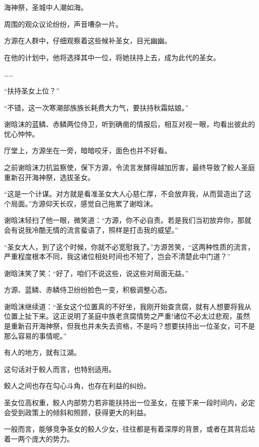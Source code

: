 
\begin{this_body}

海神祭，圣城中人潮如海。

周围的观众议论纷纷，声音嘈杂一片。

方源在人群中，仔细观察着这些候补圣女，目光幽幽。

在他的计划中，他将选择其中一位，将她扶持上去，成为此代的圣女。

……

“扶持圣女上位？”

“不错，这一次寒潮部族族长耗费大力气，要扶持秋霜姑娘。”

谢晗沫的蓝鳞、赤鳞两位侍卫，听到确凿的情报后，相互对视一眼，均看出彼此的忧心忡忡。

厅堂上，方源坐在一旁，暗暗咬牙，面色也并不好看。

之前谢晗沫力抗监察使，保下方源，令流言发酵得越加厉害，最终导致了鲛人圣庭重新召开海神祭，选拔圣女。

“这是一个计谋。对方就是看准圣女大人心慈仁厚，不会放弃我，从而营造出了这个局面。”方源仰天长叹，感觉自己拖累了谢晗沫。

谢晗沫轻扫了他一眼，微笑道：“方源，你不必自责。若是我们当初放弃你，那就会有说我冷酷无情的流言蜚语了，照样是打击我的威望。”

“圣女大人，到了这个时候，你就不必宽慰我了。”方源苦笑，“这两种性质的流言，严重程度根本不同，我这诸位相处时间也不短了，岂会不清楚此中门道？”

谢晗沫笑了笑：“好了，咱们不说这些，说这些对局面无益。”

方源、蓝鳞、赤鳞侍卫纷纷脸色一变，积极调整心态。

谢晗沫继续道：“圣女这个位置真的不好坐，我刚开始查贪腐，就有人想要将我从位置上扯下来。这正说明了圣庭中族老贪腐情势之严重!诸位不必太过悲观，虽然是重新召开海神祭，但我也并未失去资格，不是吗？想要扶持出一位圣女，可不是那么容易的事情呢。”

有人的地方，就有江湖。

这句话对于鲛人而言，也特别适用。

鲛人之间也存在勾心斗角，也存在利益的纠纷。

圣女位高权重，鲛人内部势力若非能扶持出一位圣女，在接下来一段时间内，必定会受到政策上的倾斜和照顾，获得更大的利益。

一般而言，能够竞争圣女的鲛人少女，往往都是有着深厚的背景，或者在其背后站着一两个庞大的势力。


\end{this_body}
